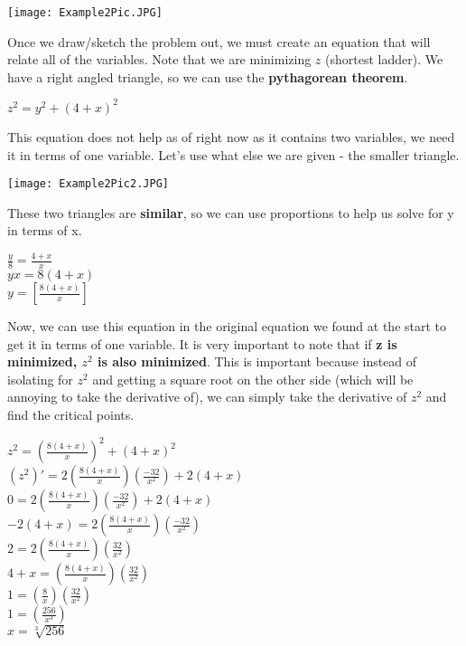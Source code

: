 \documentclass[12pt,fleqn]{book} %
\begin{document}
\pagebreak



\begin{center}
    \texttt{[image: Example2Pic.JPG]}
\end{center}

\noindent Once we draw/sketch the problem out, we must create an equation that will relate all of the variables. Note that we are minimizing $z$ (shortest ladder).
We have a right angled triangle, so we can use the \textbf{pythagorean theorem}.

\begin{center}
    $z^2=y^2+(4+x)^2$
\end{center}

\noindent This equation does not help as of right now as it contains two variables, we need it in terms of one variable. Let's use what else we are given - the smaller triangle.

\begin{center}
    \texttt{[image: Example2Pic2.JPG]}
\end{center}

\noindent These two triangles are \textbf{similar}, so we can use proportions to help us solve for y in terms of x.

\begin{center}
    \large{$\frac{y}{8}=\frac{4+x}{x}$ \\
    $yx = 8(4+x)$ \\
    $y=[\frac{8(4+x)}{x}]$}
\end{center}

\noindent Now, we can use this equation in the original equation we found at the start to get it in terms of one variable. It is very important to note
that if \textbf{z is minimized, $z^2$ is also minimized}. This is important because instead of isolating for $z^2$ and getting a square root on the other
side (which will be annoying to take the derivative of), we can simply take the derivative of $z^2$ and find the critical points.

\begin{center}
    $z^2=(\frac{8(4+x)}{x})^2+(4+x)^2$ \\
    $(z^2)'=2(\frac{8(4+x)}{x})(\frac{-32}{x^2})+2(4+x)$ \\
    $0=2(\frac{8(4+x)}{x})(\frac{-32}{x^2})+2(4+x)$ \\
    $-2(4+x)=2(\frac{8(4+x)}{x})(\frac{-32}{x^2})$ \\
    $2=2(\frac{8(4+x)}{x})(\frac{32}{x^2})$ \\
    $4+x=(\frac{8(4+x)}{x})(\frac{32}{x^2})$ \\
    $1=(\frac{8}{x})(\frac{32}{x^2})$ \\
    $1=(\frac{256}{x^3})$ \\
    $x=\sqrt[3]{256}$
\end{center}
\end{document}
